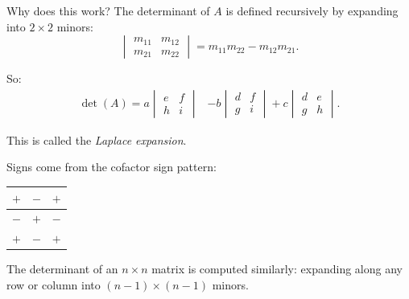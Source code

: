 \documentclass{beamer}
\begin{document}
	\begin{frame}{Why does this work?}
	The determinant of \(A\) is defined recursively by expanding into \(2 \times 2\) minors:
		\begin{equation}
		\begin{vmatrix} 
		m_{11} & m_{12} \\ m_{21} & m_{22} 
		\end{vmatrix} =
		m_{11}m_{22} - m_{12}m_{21}.
		\end{equation}
	
	So:
		\begin{align}
		\det(A) =
		a 
		\begin{vmatrix} 
		e & f \\ h & i 
		\end{vmatrix}
		&- b 
		\begin{vmatrix} 
		d & f \\ g & i 
		\end{vmatrix}
		+ c 
		\begin{vmatrix} 
		d & e \\ g & h 
		\end{vmatrix}. 
		\end{align}
	
	\vspace{0.2cm}
	This is called the \emph{Laplace expansion}.
	
	Signs come from the cofactor sign pattern:
		\begin{center}
			\begin{tabular}{|c|c|c|}
			\hline
			\cellcolor{blue!20} \(+\) & \cellcolor{red!20} \(-\) & \cellcolor{blue!20} \(+\) \\ \hline
			\cellcolor{red!20} \(-\) & \cellcolor{blue!20} \(+\) & \cellcolor{red!20} \(-\) \\ \hline
			\cellcolor{blue!20} \(+\) & \cellcolor{red!20} \(-\) & \cellcolor{blue!20} \(+\) \\ \hline
			\end{tabular}
		\end{center}
	The determinant of an \(n \times n\) matrix is computed similarly: expanding along any row or column into \((n-1) \times (n-1)\) minors.
	\end{frame}
\end{document}

